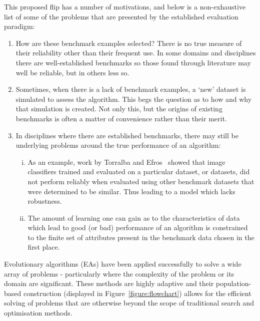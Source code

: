 This proposed flip has a number of motivations, and below is a non-exhaustive
list of some of the problems that are presented by the established evaluation
paradigm:

\begin{enumerate}
    \item How are these benchmark examples selected? There is no true measure of
        their reliability other than their frequent use. In some domains and
        disciplines there are well-established benchmarks so those found through
        literature may well be reliable, but in others less so.
    \item Sometimes, when there is a lack of benchmark examples, a `new' dataset
        is simulated to assess the algorithm. This begs the question as to how
        and why that simulation is created. Not only this, but the origins of
        existing benchmarks is often a matter of convenience rather than their
        merit.
    \item In disciplines where there are established benchmarks, there may still
        be underlying problems around the true performance of an algorithm:
        \begin{enumerate}[(i)]
            \item As an example, work by Torralba and Efros~\cite{Torralba2011}
                showed that image classifiers trained and evaluated on a
                particular dataset, or datasets, did not perform reliably when
                evaluated using other benchmark datasets that were determined
                to be similar. Thus leading to a model which lacks robustness.
            \item The amount of learning one can gain as to the characteristics
                of data which lead to good (or bad) performance of an algorithm
                is constrained to the finite set of attributes present in the
                benchmark data chosen in the first place.
        \end{enumerate}
\end{enumerate}

Evolutionary algorithms (EAs) have been applied successfully to solve a wide
array of problems \-- particularly where the complexity of the problem or its
domain are significant. These methods are highly adaptive and
their population-based construction (displayed in Figure~\ref{figure:flowchart})
allows for the efficient solving of problems that are otherwise beyond the scope
of traditional search and optimisation methods.

